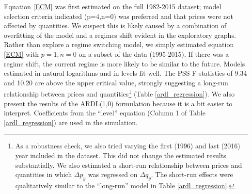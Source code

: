 \documentclass[]{article}
\let\rmarkdownfootnote\footnote%
\def\footnote{\protect\rmarkdownfootnote}
\begin{document}
Equation \ref{ECM} was first estimated on the full 1982-2015 dataset;
model selection criteria indicated (p=4,n=0) was preferred and that
prices were not affected by quantities. We suspect this is likely caused
by a combination of overfitting of the model and a regimes shift evident
in the exploratory graphs. Rather than explore a regime switching model,
we simply estimated equation \ref{ECM} with \(p=1, n=0\) on a subset of
the data (1995-2015). If there was a regime shift, the current regime is
more likely to be similar to the future. Models estimated in natural
logarithms and in levels fit well. The PSS F-statistics of 9.34 and
10.20 are above the upper critical value, strongly suggesting a long-run
relationship between prices and quantities\footnote{As a robustness
  check, we also tried varying the first (1996) and last (2016) year
  included in the dataset. This did not change the estimated results
  substantially. We also estimated a short-run relationship between
  prices and quantities in which \(\Delta p_y\) was regressed on
  \(\Delta q_y\). The short-run effects were qualitatively similar to
  the ``long-run'' model in Table \ref{ardl_regression}.} (Table
\ref{ardl_regression}). We also present the results of the ARDL(1,0)
formulation because it is a bit easier to interpret. Coefficients from
the ``level'' equation (Column 1 of Table \ref{ardl_regression}) are
used in the simulation.
\end{document}
